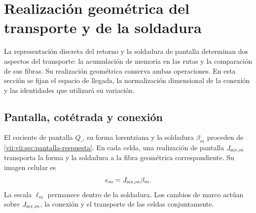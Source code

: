 
\section{Realización geométrica del transporte y de la soldadura}
\label{vii:vii:sec:realizacion-cartan}

La representación discreta del retorno y la soldadura de pantalla
determinan dos aspectos del transporte: la acumulación de memoria en
las rutas y la comparación de sus fibras. Su realización geométrica
conserva ambas operaciones. En esta sección se fijan el espacio de
llegada, la normalización dimensional de la conexión y las identidades
que utilizará su variación.

\subsection{Pantalla, cotétrada y conexión}

El cociente de pantalla \(Q_\square\), su forma lorentziana y la
soldadura \(\beta_m\) proceden de
\ref{vii:vii:sec:pantalla-respuesta}. En cada celda, una realización de
pantalla \(J_{{\rm scr},m}\) transporta la forma y la soldadura
a la fibra geométrica correspondiente. Su imagen celular es
\[
 e_m=J_{{\rm scr},m}\beta_m.
\]
La escala \(\ell_m\) permanece dentro de la soldadura. Los
cambios de marco actúan sobre \(J_{{\rm scr},m}\), la conexión
y el transporte de las celdas conjuntamente.


